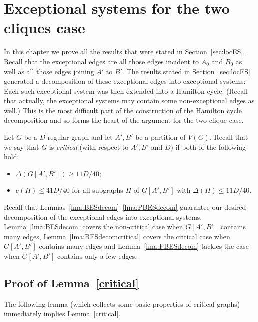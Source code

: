 \documentclass{memo-l}
\def\COMMENT#1{}
\numberwithin{section}{chapter}
\numberwithin{equation}{section}
\numberwithin{firstthm}{section}
\numberwithin{figure}{section}
\begin{document}
{%
\chapter{Exceptional systems for the two cliques case}\label{paper4}

In this chapter we prove all the results that were stated in Section~\ref{sec:locES}.
Recall that the exceptional edges are all those edges incident to $A_0$ and $B_0$ as well as all those edges joining $A'$ to $B'$.
The results stated in Section~\ref{sec:locES} generated a decomposition of 
these exceptional edges  into exceptional  systems: Each such exceptional system
was then  extended into a Hamilton cycle. (Recall that actually, the exceptional systems  may contain some non-exceptional edges as well.)
This is the most difficult part of the construction of the Hamilton cycle decomposition and so forms the heart of the argument for the two clique case.

Let $G$ be a $D$-regular graph and let $A',B'$ be a partition of $V(G)$. 
Recall that we say that
$G$ is \emph{critical} (with respect to $A',B'$ and $D$) if both of the following hold:
\begin{itemize}
\item $\Delta(G[A',B']) \ge 11 D/40$;
\item  $e(H) \le 41 D/40$ for all subgraphs $H$ of $G[A',B']$ with $\Delta(H) \le 11 D/40$.%
     \COMMENT{Note that there is no assumption on $e_G(A',B')$.}
\end{itemize}

Recall that Lemmas~\ref{lma:BESdecom}--\ref{lma:PBESdecom} guarantee our desired decomposition of the exceptional edges into exceptional systems.
Lemma~\ref{lma:BESdecom} covers the non-critical case when $G[A',B']$  contains many edges, Lemma~\ref{lma:BESdecomcritical} covers the critical case when $G[A',B']$  contains many edges
and Lemma~\ref{lma:PBESdecom} tackles the case when $G[A',B']$ contains
only a few edges.



\section{Proof of Lemma~\ref{critical}}\label{secnewzz}

The following lemma (which collects some basic properties of critical graphs) immediately implies Lemma~\ref{critical}.

}
\end{document}
